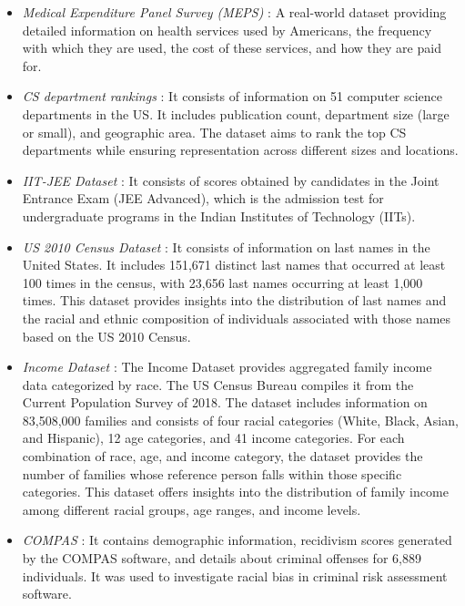 \begin{itemize}
    \item \emph{Medical Expenditure Panel Survey (MEPS)} \cite{cohen2009medical}: A real-world dataset providing detailed information on health services used by Americans, the frequency with which they are used, the cost of these services, and how they are paid for.
    
    \item \emph{CS department rankings} \cite{csranking}: It consists of information on 51 computer science departments in the US. It includes publication count, department size (large or small), and geographic area. The dataset aims to rank the top CS departments while ensuring representation across different sizes and locations.
    
    \item \emph{IIT-JEE Dataset} \cite{team2011}: It consists of scores obtained by candidates in the Joint Entrance Exam (JEE Advanced), which is the admission test for undergraduate programs in the Indian Institutes of Technology (IITs).
    
    \item \emph{US 2010 Census Dataset}
    \cite{bureau2010frequently}:
    It consists of information on last names in the United States. It includes 151,671 distinct last names that occurred at least 100 times in the census, with 23,656 last names occurring at least 1,000 times. This dataset provides insights into the distribution of last names and the racial and ethnic composition of individuals associated with those names based on the US 2010 Census.

    \item \emph{Income Dataset} \cite{bureaufinc02}: The Income Dataset provides aggregated family income data categorized by race. The US Census Bureau compiles it from the Current Population Survey of 2018. The dataset includes information on 83,508,000 families and consists of four racial categories (White, Black, Asian, and Hispanic), 12 age categories, and 41 income categories. For each combination of race, age, and income category, the dataset provides the number of families whose reference person falls within those specific categories. This dataset offers insights into the distribution of family income among different racial groups, age ranges, and income levels.
    
    
    \item \emph{COMPAS} \cite{angwin2016machine}: It contains demographic information, recidivism scores generated by the COMPAS software, and details about criminal offenses for 6,889 individuals.
    It was used to investigate racial bias in criminal risk assessment software.
    

\end{itemize}
